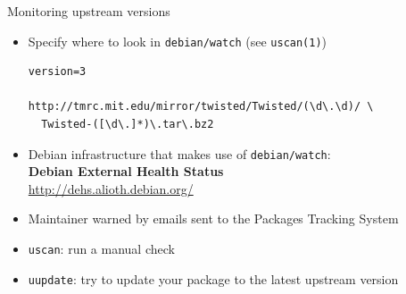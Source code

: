 \documentclass[10pt,final]{beamer}
\begin{document}
\begin{frame}[fragile]{Monitoring upstream versions}
  \begin{itemize}
  \item Specify where to look in \texttt{debian/watch} (see \texttt{uscan(1)})
    \begin{lstlisting}[basicstyle=\ttfamily\footnotesize]
version=3

http://tmrc.mit.edu/mirror/twisted/Twisted/(\d\.\d)/ \
  Twisted-([\d\.]*)\.tar\.bz2
    \end{lstlisting}
    \br
  \item Debian infrastructure that makes use of \texttt{debian/watch}:\\
    \textbf{Debian External Health Status}\\
    \url{http://dehs.alioth.debian.org/}
    \br
  \item Maintainer warned by emails sent to the Packages Tracking System
    \br
  \item \texttt{uscan}: run a manual check
    \br
  \item \texttt{uupdate}: try to update your package to the latest upstream version
  \end{itemize}
\end{frame}
\end{document}
